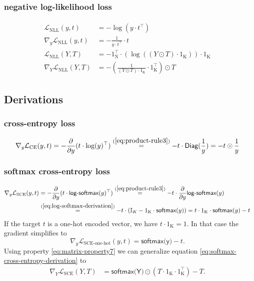 \documentclass{article}
\newcommand{\const}[1]{\ensuremath{\mathrm{#1}}} %
\newcommand{\func}[1]{\ensuremath{\textsf{#1}}} %
\newcommand{\Partial}[1]{\frac{\partial}{\partial #1}}
\begin{document}
\subsubsection*{negative log-likelihood loss}
\begin{align}
\begin{split}
  \mathcal{L}_\text{NLL}(y, t) &= - \log(y \cdot t^\top)
  \\
  \nabla_y \mathcal{L}_\text{NLL}(y, t) &= - \frac{1}{y \cdot t^\top} \cdot t
  \\
  \mathcal{L}_\text{NLL}(Y, T) &= - 1_\const{N}^\top \cdot (\log((Y \odot T) \cdot 1_\const{K})) \cdot 1_\const{K}
  \\
  \nabla_Y \mathcal{L}_\text{NLL}(Y, T) &= -\left( \frac{1}{(Y \odot T) \cdot 1_\const{K}} \cdot 1_\const{K}^\top \right) \odot T
\end{split}
\end{align}

\subsection{Derivations}

\subsubsection*{cross-entropy loss}
\begin{align}
\begin{split}
\nabla_y \mathcal{L}_\text{CE}(y, t)
&= - \Partial{y} (t \cdot \log(y)^\top)
\overset{(\ref{eq:product-rule3})}{=} - t \cdot \func{Diag}(\frac{1}{y})
= - t \odot \frac{1}{y} \\
\end{split}
\end{align}

\subsubsection*{softmax cross-entropy loss}
\begin{align}
\label{eq:softmax-cross-entropy-derivation}
\begin{split}
\nabla_y \mathcal{L}_\text{SCE}(y, t) 
&= - \Partial{y} (t \cdot \func{log-softmax}(y)^\top)
\overset{(\ref{eq:product-rule3})}{=} - t \cdot \Partial{y} \func{log-softmax}(y) 
\\
& \overset{(\ref{eq:log-softmax-derivation})}{=} -t \cdot \left(\mathbb{I}_K - 1_\const{K} \cdot \func{softmax}(y) \right)
= t \cdot 1_\const{K} \cdot \func{softmax}(y) - t
\end{split}
\end{align}
If the target $t$ is a one-hot encoded vector, we have $t \cdot 1_\const{K} = 1$. In that case the gradient simplifies to
\[
  \nabla_y \mathcal{L}_\text{SCE-one-hot}(y, t) = \func{softmax(y)} - t.
\]
Using property \eqref{eq:matrix-property7} we can generalize equation \eqref{eq:softmax-cross-entropy-derivation} to
\begin{align*}
\nabla_Y \mathcal{L}_\text{SCE}(Y, T)
&= \func{softmax(Y)} \odot (T \cdot 1_\const{K} \cdot 1_\const{K}^\top) - T.
\end{align*}
\end{document}
